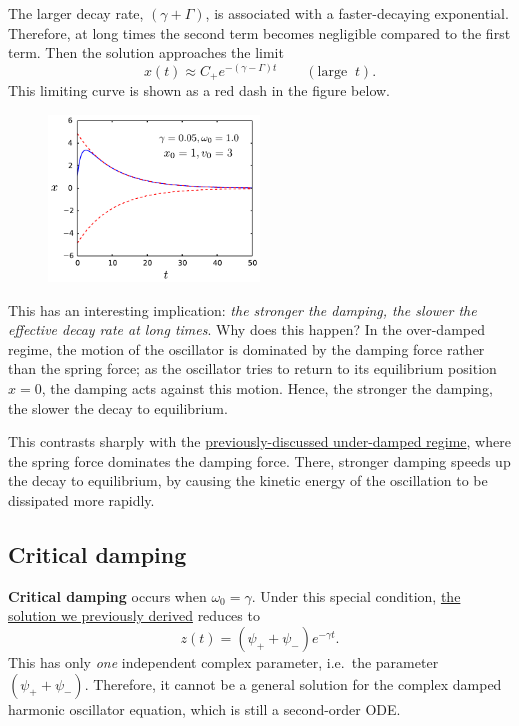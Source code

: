 \documentclass[10pt,a4paper]{article}
\begin{document}
The larger decay rate, $(\gamma + \Gamma)$, is associated with a
faster-decaying exponential. Therefore, at long times the second term
becomes negligible compared to the first term. Then the solution
approaches the limit
\begin{equation}
  x(t) \approx C_+ e^{-(\gamma - \Gamma) t} \qquad (\mathrm{large}\;\;t).
\end{equation}
This limiting curve is shown as a red dash in the figure below.

\begin{figure}[h]
  \centering\includegraphics[width=0.5\textwidth]{overdamped}
\end{figure}

\noindent
This has an interesting implication: \emph{the stronger the damping,
  the slower the effective decay rate at long times}. Why does this
happen? In the over-damped regime, the motion of the oscillator is
dominated by the damping force rather than the spring force; as the
oscillator tries to return to its equilibrium position $x = 0$, the
damping acts against this motion. Hence, the stronger the damping, the
slower the decay to equilibrium.

This contrasts sharply with the
\hyperref[under-damped-motion]{previously-discussed under-damped
  regime}, where the spring force dominates the damping force.  There,
stronger damping speeds up the decay to equilibrium, by causing the
kinetic energy of the oscillation to be dissipated more rapidly.

\subsection{Critical damping}
\label{critical-damping}

\textbf{Critical damping} occurs when $\omega_0 = \gamma$. Under this
special condition, \hyperref[general-solution]{the solution we
  previously derived} reduces to
\begin{equation}
  z(t) = \left(\psi_+ + \psi_-\right) e^{-\gamma t}.
\end{equation}
This has only \emph{one} independent complex parameter, i.e.~the
parameter $(\psi_+ + \psi_-)$. Therefore, it cannot be a general
solution for the complex damped harmonic oscillator equation, which is
still a second-order ODE.
\end{document}
